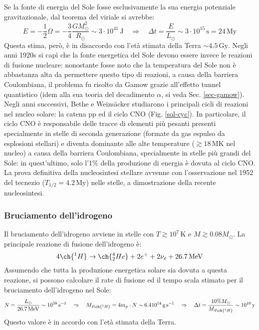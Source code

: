 Se la fonte di energia del Sole fosse esclusivamente la sua energia potenziale gravitazionale, dal teorema del viriale si avrebbe:
\begin{equation*}
	E = -\frac{1}{2} \Omega = - \frac{3}{4} \frac{GM_\odot^2}{R_\odot} \sim 3 \cdot 10^{41} \,\text{J}
	\quad \Rightarrow \quad
	\Delta t = \frac{E}{L_\odot} \sim 3 \cdot 10^{15} \,\text{s} = 24 \,\text{My}
\end{equation*}
Questa stima, però, è in disaccordo con l'età stimata della Terra $ \sim 4.5 \,\text{Gy} $. Negli anni 1920s si capì che la fonte energetica del Sole devono essere invece le reazioni di fusione nucleare: nonostante fosse noto che la temperatura del Sole non è abbastanza alta da permettere questo tipo di reazioni, a causa della barriera Coulombiana, il problema fu risolto da Gamow grazie all'effetto tunnel quantistico (idem alla sua teoria del decadimento $ \alpha $, si veda Sec. \ref{sec-gamow}). Negli anni successivi, Bethe e Weizsäcker studiarono i principali cicli di reazioni nel nucleo solare: la catena pp ed il ciclo CNO (Fig. \ref{sol-cyc}). In particolare, il ciclo CNO è responsabile delle tracce di elementi più pesanti presenti specialmente in stelle di seconda generazione (formate da gas espulso da esplosioni stellari) e diventa dominante alle alte temperature ($ \gtrsim 18 \,\text{MK} $ nel nucleo) a causa della barriera Coulombiana, specialmente in stelle più grandi del Sole: in quest'ultimo, solo l'1\% della produzione di energia è dovuta al ciclo CNO. La prova definitiva della nucleosintesi stellare avvenne con l'osservazione nel 1952 del tecnezio ($ T_{1/2} = 4.2 \,\text{My} $) nelle stelle, a dimostrazione della recente nucleosintesi.

\subsubsection{Bruciamento dell'idrogeno}

Il bruciamento dell'idrogeno avviene in stelle con $ T \gtrsim 10^7 \,\text{K} $ e $ M \gtrsim 0.08 M_\odot $. La principale reazione di fusione dell'idrogeno è:
\begin{equation*}
	4 \ch{^1 H} \rightarrow \ch{^4_2 He} + 2 e^+ + 2 \nu_e + 26.7\mev
\end{equation*}
Assumendo che tutta la produzione energetica solare sia dovuta a questa reazione, si possono calcolare il rate di fusione ed il tempo scala stimato per il bruciamento dell'idrogeno nel Sole:
\begin{equation*}
	N = \frac{L_\odot}{26.7\mev} \sim 10^{38} \,\text{s}^{-1}
	\quad \Rightarrow \quad
	M_{4\ch{^1 H}} = 4 m_p \cdot N \sim 6.4 10^{14} \,\text{g} \,\text{s}^{-1}
	\quad \Rightarrow \quad
	\Delta t = \frac{10\% M_\odot}{M_{4\ch{^1 H}}} \sim 10^{10} \,\text{y}
\end{equation*}
Questo valore è in accordo con l'età stimata della Terra.

